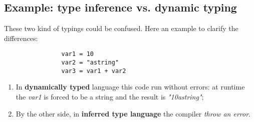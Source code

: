 \documentclass[12pt]{article}
\begin{document}
		\subsection{Example: type inference vs. dynamic typing}
			These two kind of typings could be confused. Here an example to clarify the differences:

			\begin{lstlisting}
				var1 = 10
				var2 = "astring"
				var3 = var1 + var2
			\end{lstlisting}
			
			\begin{enumerate}
				\item In \textbf{dynamically typed} language this code run without errors: at runtime the \textit{var1} is forced to be a string and the result is \textit{"10astring"};
				\item By the other side, in \textbf{inferred type language} the compiler \textit{throw an error}.
			\end{enumerate}
		







		
\end{document}
